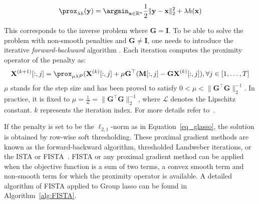 \begin{equation}
\prox_{\lambda\mathit{h}}(\mathbf{y})=\argmin_{\mathbf{x}\in\RR^n}\frac{1}{2}\|\mathbf{y}-\mathbf{x}\|_2^2+\lambda\mathit{h}(\mathbf{x})
\end{equation}

This corresponds to the inverse problem where $\mathbf{G}=\mathbf{I}$. To be able to solve the problem with non-smooth penalties and $\mathbf{G}\neq\mathbf{I}$, one needs to introduce the iterative \textit{forward-backward} algorithm \cite{moreau1965proximite}. Each iteration computes the proximity operator of the penalty as:
\begin{equation}
\mathbf{X}^{(k+1)}[:,j]=\prox_{\mu\lambda\mathcal{P}}(\mathbf{X}^{(k)}[:,j]+\mu\mathbf{G}^\top(\mathbf{M}[:,j]-\mathbf{GX}^{(k)}[:,j]), \forall j\in [1,\dots ,T]
\end{equation}
$\mu$ stands for the step size and has been proved to satisfy $0<\mu<\|\mathbf{G}^\top\mathbf{G}\|_2^{-1}$. In practice, it is fixed to $\mu=\frac{1}{\mathcal{L}}=
 \|\mathbf{G}^\top\mathbf{G}\|_2^{-1}$, where $\mathcal{L}$ denotes the Lipschitz constant. $k$ represents the iteration index. For more details refer to~\cite{moreau1965proximite,combettes2005signal,daubechies2004iterative}.

If the penalty is set to be the $\ell_{2,1}$-norm as in Equation~\eqref{eq_glasso}, the solution is obtained by row-wise soft thresholding. These proximal gradient methods are known as the forward-backward algorithm, thresholded Landweber iterations, or the \ac{ISTA} or \ac{FISTA}~\cite{bach2012optimization,parikh2014proximal}. FISTA or any proximal gradient method can be applied when the objective function is a sum of two terms, a convex smooth term and non-smooth term for which the proximity operator is available.
A detailed algorithm of FISTA applied to Group \ac{lasso} can be found in Algorithm~\ref{alg:FISTA}. 

